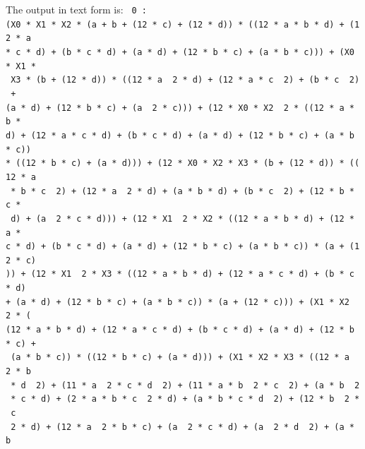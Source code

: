 The output in text form is:
{\tt
  0 : \\
(X0\ *\ X1\ *\ X2\ *\ (a\ +\ b\ +\ (12\ *\ c)\ +\ (12\ *\ d))\ *\ ((12\ *\ a\ *\ b\ *\ d)\ +\ (12\ *\ a\ \\
*\ c\ *\ d)\ +\ (b\ *\ c\ *\ d)\ +\ (a\ *\ d)\ +\ (12\ *\ b\ *\ c)\ +\ (a\ *\ b\ *\ c)))\ +\ (X0\ *\ X1\ *\\
\ X3\ *\ (b\ +\ (12\ *\ d))\ *\ ((12\ *\ a\ \ 2\ *\ d)\ +\ (12\ *\ a\ *\ c\ \ 2)\ +\ (b\ *\ c\ \ 2)\ +\ \\
(a\ *\ d)\ +\ (12\ *\ b\ *\ c)\ +\ (a\ \ 2\ *\ c)))\ +\ (12\ *\ X0\ *\ X2\ \ 2\ *\ ((12\ *\ a\ *\ b\ *\ \\
d)\ +\ (12\ *\ a\ *\ c\ *\ d)\ +\ (b\ *\ c\ *\ d)\ +\ (a\ *\ d)\ +\ (12\ *\ b\ *\ c)\ +\ (a\ *\ b\ *\ c))\ \\
*\ ((12\ *\ b\ *\ c)\ +\ (a\ *\ d)))\ +\ (12\ *\ X0\ *\ X2\ *\ X3\ *\ (b\ +\ (12\ *\ d))\ *\ ((12\ *\ a\\
\ *\ b\ *\ c\ \ 2)\ +\ (12\ *\ a\ \ 2\ *\ d)\ +\ (a\ *\ b\ *\ d)\ +\ (b\ *\ c\ \ 2)\ +\ (12\ *\ b\ *\ c\ *\\
\ d)\ +\ (a\ \ 2\ *\ c\ *\ d)))\ +\ (12\ *\ X1\ \ 2\ *\ X2\ *\ ((12\ *\ a\ *\ b\ *\ d)\ +\ (12\ *\ a\ *\ \\
c\ *\ d)\ +\ (b\ *\ c\ *\ d)\ +\ (a\ *\ d)\ +\ (12\ *\ b\ *\ c)\ +\ (a\ *\ b\ *\ c))\ *\ (a\ +\ (12\ *\ c)\\
))\ +\ (12\ *\ X1\ \ 2\ *\ X3\ *\ ((12\ *\ a\ *\ b\ *\ d)\ +\ (12\ *\ a\ *\ c\ *\ d)\ +\ (b\ *\ c\ *\ d)\ \\
+\ (a\ *\ d)\ +\ (12\ *\ b\ *\ c)\ +\ (a\ *\ b\ *\ c))\ *\ (a\ +\ (12\ *\ c)))\ +\ (X1\ *\ X2\ \ 2\ *\ (\\
(12\ *\ a\ *\ b\ *\ d)\ +\ (12\ *\ a\ *\ c\ *\ d)\ +\ (b\ *\ c\ *\ d)\ +\ (a\ *\ d)\ +\ (12\ *\ b\ *\ c)\ +\\
\ (a\ *\ b\ *\ c))\ *\ ((12\ *\ b\ *\ c)\ +\ (a\ *\ d)))\ +\ (X1\ *\ X2\ *\ X3\ *\ ((12\ *\ a\ \ 2\ *\ b\\
\ *\ d\ \ 2)\ +\ (11\ *\ a\ \ 2\ *\ c\ *\ d\ \ 2)\ +\ (11\ *\ a\ *\ b\ \ 2\ *\ c\ \ 2)\ +\ (a\ *\ b\ \ 2\\
\ *\ c\ *\ d)\ +\ (2\ *\ a\ *\ b\ *\ c\ \ 2\ *\ d)\ +\ (a\ *\ b\ *\ c\ *\ d\ \ 2)\ +\ (12\ *\ b\ \ 2\ *\ c\ \\
\ 2\ *\ d)\ +\ (12\ *\ a\ \ 2\ *\ b\ *\ c)\ +\ (a\ \ 2\ *\ c\ *\ d)\ +\ (a\ \ 2\ *\ d\ \ 2)\ +\ (a\ *\ b\\
}
